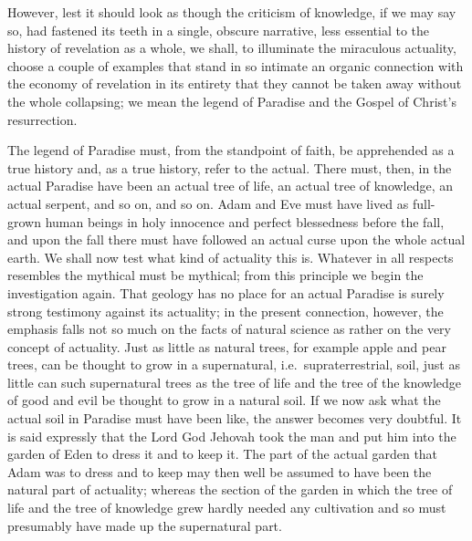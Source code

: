 \documentclass[12pt]{book}
\newcommand{\opage}[1]{\marginnote{\footnotesize\textit{[#1]}}}
\begin{document}
However, lest it should look as though the criticism of knowledge, if we
may say so, had fastened its teeth in a single, obscure narrative, less
essential to the history of revelation as a whole, we shall, to
illuminate the miraculous actuality, choose a couple of examples that
stand in so intimate an organic connection with the economy of
revelation in its entirety that they cannot be taken away without the
whole collapsing; we mean the legend of Paradise and the Gospel of
Christ's resurrection.

\opage{160}\setcounter{footnote}{0}%
The legend of Paradise must, from the standpoint of faith, be
apprehended as a true history and, as a true history, refer to the
actual. There must, then, in the actual Paradise have been an actual
tree of life, an actual tree of knowledge, an actual serpent, and so on,
and so on. Adam and Eve must have lived as full-grown human beings in
holy innocence and perfect blessedness before the fall, and upon the
fall there must have followed an actual curse upon the whole actual
earth. We shall now test what kind of actuality this is. Whatever in all
respects resembles the mythical must be mythical; from this principle we
begin the investigation again. That geology has no place for an actual
Paradise is surely strong testimony against its actuality; in the
present connection, however, the emphasis falls not so much on the facts
of natural science as rather on the very concept of actuality. Just as
little as natural trees, for example apple and pear trees, can be
thought to grow in a supernatural, i.e.\ supraterrestrial, soil, just
as little can such supernatural trees as the tree of life and the tree
of the knowledge of good and evil be thought to grow in a natural soil.
If we now ask what the actual soil in Paradise must have been like, the
answer becomes very doubtful. It is said expressly that the Lord God
Jehovah took the man and put him into the garden of Eden to dress it and
to keep it. The part of the actual garden that Adam was to dress and to
keep may then well be assumed to have been the natural part of
actuality; whereas the section of the garden in which the tree of life
and the tree of knowledge grew hardly needed any cultivation and so
must presumably have made up the supernatural part.
\end{document}
